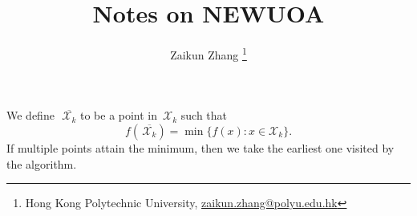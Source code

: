\documentclass[11pt,a4paper,draft]{article}  %
\title{Notes on NEWUOA}
\date{\DTMnow}
\author{Zaikun Zhang
    \thanks{Hong Kong Polytechnic University, \url{zaikun.zhang@polyu.edu.hk}}
}
\theoremstyle{definition}
\numberwithin{equation}{section}
\newcommand{\mbar}[1]{\,\overline{\!\!{#1}\!}} %
\newcommand{\Int}{\mathcal{X}}
\begin{document}
\maketitle



We define~$\mbar{\Int_k}$ to be a point in~$\Int_k$ such that
\begin{equation}
    \label{eq:xopt}
    f(\mbar{\Int_k}) = \min\{f(x) \mathrel{:} x\in \Int_k\}.
\end{equation}
If multiple points attain the minimum, then we take the earliest one visited by the algorithm.
\end{document}
